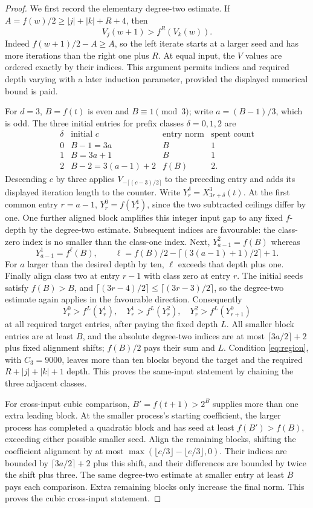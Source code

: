 \documentclass[11pt]{article}
\begin{document}
\begin{proof}
We first record the elementary degree-two estimate. If
$A=f(w)/2\ge |j|+|k|+R+4$, then
\[
 V_j(w+1)>f^R(V_k(w)).
\]
Indeed $f(w+1)/2-A\ge A$, so the left iterate starts at a larger seed and
has more iterations than the right one plus $R$. At equal input, the $V$
values are ordered exactly by their indices. This argument permits indices
and required depth varying with a later induction parameter, provided the
displayed numerical bound is paid.

For $d=3$, $B=f(t)$ is even and $B\equiv1\pmod3$; write
$a=(B-1)/3$, which is odd. The three initial entries for prefix classes
$\delta=0,1,2$ are
\[
\begin{array}{c|ccc}
\delta&\text{initial }c&\text{entry norm}&\text{spent count}\\ \hline
0&B-1=3a&B&1\\
1&B=3a+1&B&1\\
2&B-2=3(a-1)+2&f(B)&2.
\end{array}
\]
Descending $c$ by three applies $V_{-\lceil(c-3)/2\rceil}$ to the preceding
entry and adds its displayed iteration length to the counter. Write
$Y^\delta_r=X^3_{3r+\delta}(t)$. At the first common entry $r=a-1$,
$Y^0_r=f(Y^1_r)$, since the two subtracted ceilings differ by one. One
further aligned block amplifies this integer input gap to any fixed
$f$-depth by the degree-two estimate. Subsequent indices are favourable:
the class-zero index is no smaller than the class-one index. Next,
$Y^2_{a-1}=f(B)$ whereas
\[
 Y^1_{a-1}=f^\ell(B),\qquad
 \ell=f(B)/2-\lceil(3(a-1)+1)/2\rceil+1.
\]
For $a$ larger than the desired depth by ten, $\ell$ exceeds that depth
plus one. Finally align class two at entry $r-1$ with class zero at entry
$r$. The initial seeds satisfy $f(B)>B$, and
$\lceil(3r-4)/2\rceil\le\lceil(3r-3)/2\rceil$, so the degree-two
estimate again applies in the favourable direction. Consequently
\[
 Y^0_r>f^L(Y^1_r),\quad
 Y^1_r>f^L(Y^2_r),\quad
 Y^2_r>f^L(Y^0_{r+1})
\]
at all required target entries, after paying the fixed depth $L$.
All smaller block entries are at least $B$, and the absolute degree-two
indices are at most $\lceil3a/2\rceil+2$ plus fixed alignment shifts;
$f(B)/2$ pays their sum and $L$. Condition \eqref{eq:region}, with
$C_3=9000$, leaves more than ten blocks beyond the target and the required
$R+|j|+|k|+1$ depth. This proves the same-input statement by chaining the
three adjacent classes.

For cross-input cubic comparison, $B'=f(t+1)>2^B$ supplies more than one
extra leading block. At the smaller process's starting coefficient,
the larger process has completed a quadratic block and has seed at least
$f(B')>f(B)$, exceeding either possible smaller seed. Align the remaining
blocks, shifting the coefficient alignment by at most
$\max(\lfloor c/3\rfloor-\lfloor e/3\rfloor,0)$. Their indices are bounded
by $\lceil3a/2\rceil+2$ plus this shift, and their differences are bounded
by twice the shift plus three. The same degree-two estimate at smaller
entry at least $B$ pays each comparison. Extra remaining blocks only
increase the final norm. This proves the cubic cross-input statement.


\end{proof}
\end{document}
